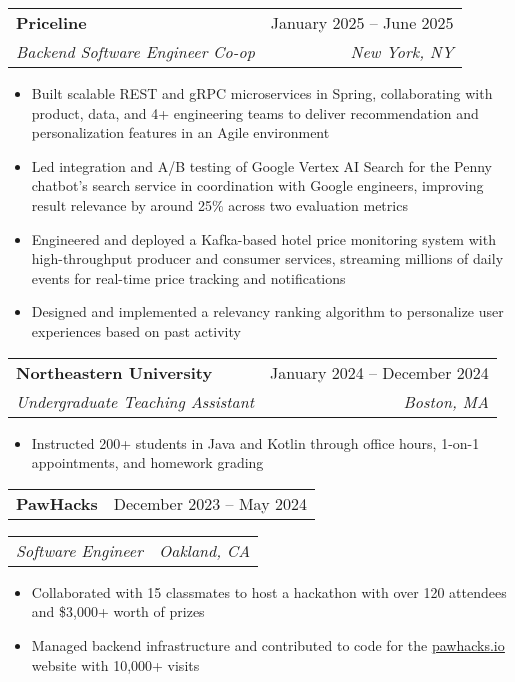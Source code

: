 \documentclass[letterpaper,11pt]{article}
\makeatletter
\newcommand{\resumeItem}[1]{
  \item\small{
    {#1 \vspace{-2pt}}
  }
}
\newcommand{\resumeSubheading}[4]{
  \vspace{-2pt}\item
    \begin{tabular*}{0.97\textwidth}[t]{l@{\extracolsep{\fill}}r}
      \textbf{#1} & #2 \\
      \textit{\small#3} & \textit{\small #4} \\
    \end{tabular*}\vspace{-7pt}
}
\newcommand{\resumeSubheadingSmall}[2]{
  \vspace{-2pt}\item
    \begin{tabular*}{0.97\textwidth}[t]{l@{\extracolsep{\fill}}r}
      \textbf{#1} & #2 \\
    \end{tabular*}\vspace{-9pt}
}
\newcommand{\resumeSubSubheading}[2]{
    \item
    \begin{tabular*}{0.97\textwidth}{l@{\extracolsep{\fill}}r}
      \textit{\small#1} & \textit{\small #2} \\
    \end{tabular*}\vspace{-7pt}
}
\newcommand{\resumeItemListStart}{\begin{itemize}}
\newcommand{\resumeItemListEnd}{\end{itemize}\vspace{-5pt}}
\makeatother
\begin{document}
  \resumeSubheading
  {Priceline}{January 2025 -- June 2025}
  {Backend Software Engineer Co-op}{New York, NY}
  \resumeItemListStart
    \resumeItem{Built scalable REST and gRPC microservices in Spring, collaborating with product, data, and 4+ engineering teams to deliver recommendation and personalization features in an Agile environment}
    \resumeItem{Led integration and A/B testing of Google Vertex AI Search for the Penny chatbot's search service in coordination with Google engineers, improving result relevance by around 25\% across two evaluation metrics}
    \resumeItem{Engineered and deployed a Kafka-based hotel price monitoring system with high-throughput producer and consumer services, streaming millions of daily events for real-time price tracking and notifications}
    \resumeItem{Designed and implemented a relevancy ranking algorithm to personalize user experiences based on past activity}
  \resumeItemListEnd

  \resumeSubheading
    {Northeastern University}{January 2024 -- December 2024}
    {Undergraduate Teaching Assistant}{Boston, MA}
    \resumeItemListStart
      \resumeItem{Instructed 200+ students in Java and Kotlin through office hours, 1-on-1 appointments, and homework grading}
    \resumeItemListEnd
    
  \resumeSubheadingSmall{PawHacks}{December 2023 -- May 2024}
    \resumeSubSubheading
    {Software Engineer}{Oakland, CA}%
    \resumeItemListStart
      \resumeItem{Collaborated with 15 classmates to host a hackathon with over 120 attendees and \$3,000+ worth of prizes}
      \resumeItem{Managed backend infrastructure and contributed to code for the \href{https://web.archive.org/web/20241229024348/https://pawhacks.io/}{\underline{pawhacks.io}} website with 10,000+ visits}
    \resumeItemListEnd
\end{document}
